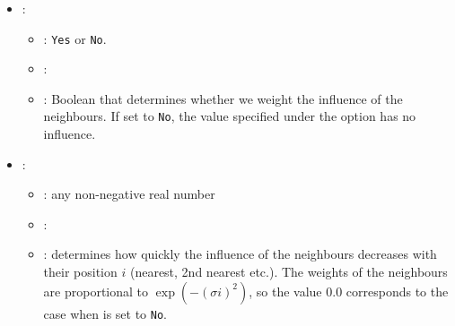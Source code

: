 \begin{itemize}
\begin{itemize}
           \end{itemize}
    \item {}:
           \begin{itemize}
                \item \optionPossibleValues{}: {\tt Yes} or {\tt No}.
                \item \optionDefaultValue{}: 
                \item \optionDescrption{}: Boolean that determines whether we weight the influence of the neighbours. If set to {\tt No},
                                           the value specified under the option  has no influence.
           \end{itemize}
    \item {}:
           \begin{itemize}
                \item \optionPossibleValues{}: any non-negative real number
                \item \optionDefaultValue{}: 
                \item \optionDescrption{}: determines how quickly the influence of the neighbours decreases with their position $i$ (nearest, 2nd nearest etc.).
                                           The weights of the neighbours are proportional to $\exp(-(\sigma i)^2)$, so the value $0.0$ corresponds to
                                           the case when   is set to {\tt No}.
           \end{itemize}
\end{itemize}
